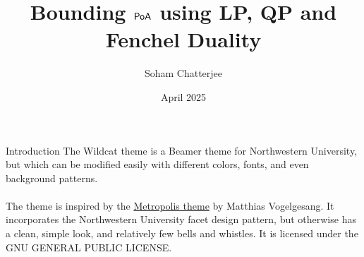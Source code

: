 \documentclass[aspectratio=1610]{beamer}
\title{Bounding $\operatorname{\mathsf{PoA}}$ using LP, QP and Fenchel Duality}
\date{April 2025}
\author{Soham Chatterjee}
\begin{document}
\begin{frame}
\titlepage
\end{frame}


\begin{frame}{Introduction}
    The Wildcat theme is a Beamer theme for Northwestern University, but which can be modified easily with different colors, fonts, and even background patterns. 
    \\ ~ \\
    The theme is inspired by the \href{https://github.com/matze/mtheme}{Metropolis theme} by Matthias Vogelgesang. It incorporates the Northwestern University facet design pattern, but otherwise has a clean, simple look, and relatively few bells and whistles. It is licensed under the GNU GENERAL PUBLIC LICENSE.
\end{frame}
\end{document}
